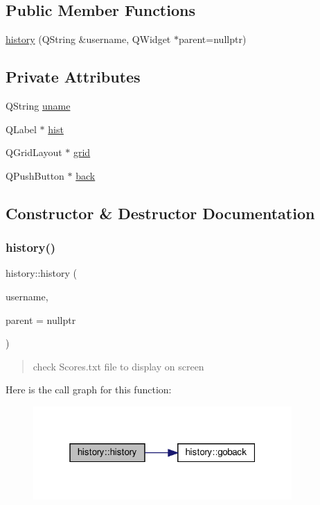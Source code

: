 \subsection*{Public Member Functions}
\begin{DoxyCompactItemize}
\item 
\hyperlink{classhistory_ab261cbbcb030455f3f777cdda691cf0a}{history} (Q\+String \&username, Q\+Widget $\ast$parent=nullptr)
\end{DoxyCompactItemize}
\subsection*{Private Attributes}
\begin{DoxyCompactItemize}
\item 
Q\+String \hyperlink{classhistory_af60d04037f156f29a87c23f5ead85177}{uname}
\item 
Q\+Label $\ast$ \hyperlink{classhistory_a182b22fa21e4b592c0ddfb83419782dc}{hist}
\item 
Q\+Grid\+Layout $\ast$ \hyperlink{classhistory_a6b0377402a79bdffed3797bd0a220f61}{grid}
\item 
Q\+Push\+Button $\ast$ \hyperlink{classhistory_a2eace55afb59f9bd4681ad8cb3ea4deb}{back}
\end{DoxyCompactItemize}


\subsection{Constructor \& Destructor Documentation}
\mbox{\label{classhistory_ab261cbbcb030455f3f777cdda691cf0a}} 
\subsubsection{\texorpdfstring{history()}{history()}}
{\footnotesize\ttfamily history\+::history (\begin{DoxyParamCaption}\item[{Q\+String \&}]{username,  }\item[{Q\+Widget $\ast$}]{parent = {\ttfamily nullptr} }\end{DoxyParamCaption})}

\begin{quote}
check Scores.\+txt file to display on screen \end{quote}
Here is the call graph for this function\+:
\nopagebreak
\begin{figure}[H]
\begin{center}
\leavevmode
\includegraphics[width=280pt]{classhistory_ab261cbbcb030455f3f777cdda691cf0a_cgraph}
\end{center}
\end{figure}


